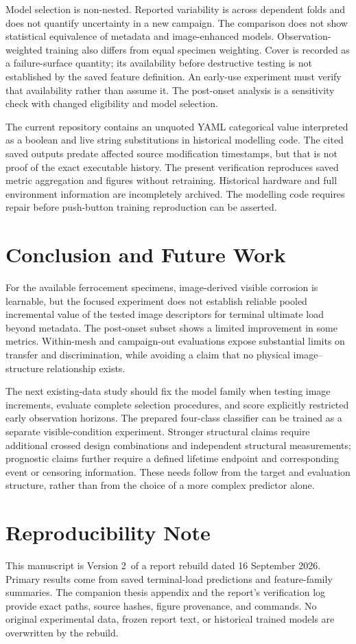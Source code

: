 \documentclass[conference]{IEEEtran}
\newcommand{\shared}{../..}
\newcommand{\draftversion}{Version 2}
\begin{document}
Model selection is non-nested. Reported variability is across dependent folds and does not quantify uncertainty in a new campaign. The comparison does not show statistical equivalence of metadata and image-enhanced models. Observation-weighted training also differs from equal specimen weighting. Cover is recorded as a failure-surface quantity; its availability before destructive testing is not established by the saved feature definition. An early-use experiment must verify that availability rather than assume it. The post-onset analysis is a sensitivity check with changed eligibility and model selection.

The current repository contains an unquoted YAML categorical value interpreted as a boolean and live string substitutions in historical modelling code. The cited saved outputs predate affected source modification timestamps, but that is not proof of the exact executable history. The present verification reproduces saved metric aggregation and figures without retraining. Historical hardware and full environment information are incompletely archived. The modelling code requires repair before push-button training reproduction can be asserted.

\section{Conclusion and Future Work}
For the available ferrocement specimens, image-derived visible corrosion is learnable, but the focused experiment does not establish reliable pooled incremental value of the tested image descriptors for terminal ultimate load beyond metadata. The post-onset subset shows a limited improvement in some metrics. Within-mesh and campaign-out evaluations expose substantial limits on transfer and discrimination, while avoiding a claim that no physical image--structure relationship exists.

The next existing-data study should fix the model family when testing image increments, evaluate complete selection procedures, and score explicitly restricted early observation horizons. The prepared four-class classifier can be trained as a separate visible-condition experiment. Stronger structural claims require additional crossed design combinations and independent structural measurements; prognostic claims further require a defined lifetime endpoint and corresponding event or censoring information. These needs follow from the target and evaluation structure, rather than from the choice of a more complex predictor alone.

\section*{Reproducibility Note}
This manuscript is \draftversion\ of a report rebuild dated 16 September 2026. Primary results come from saved terminal-load predictions and feature-family summaries. The companion thesis appendix and the report's verification log provide exact paths, source hashes, figure provenance, and commands. No original experimental data, frozen report text, or historical trained models are overwritten by the rebuild.



\end{document}
